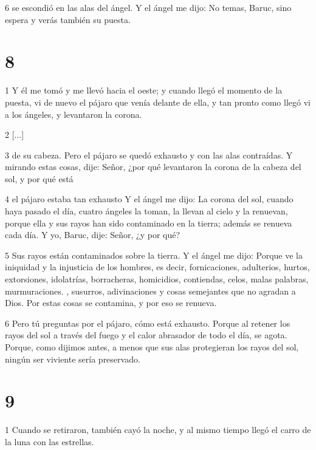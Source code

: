 \par 6 se escondió en las alas del ángel. Y el ángel me dijo: No temas, Baruc, sino espera y verás también su puesta.

\chapter{8}

\par 1 Y él me tomó y me llevó hacia el oeste; y cuando llegó el momento de la puesta, vi de nuevo el pájaro que venía delante de ella, y tan pronto como llegó vi a los ángeles, y levantaron la corona.

\par 2 [...]

\par 3 de su cabeza. Pero el pájaro se quedó exhausto y con las alas contraídas. Y mirando estas cosas, dije: Señor, ¿por qué levantaron la corona de la cabeza del sol, y por qué está

\par 4 el pájaro estaba tan exhausto Y el ángel me dijo: La corona del sol, cuando haya pasado el día, cuatro ángeles la toman, la llevan al cielo y la renuevan, porque ella y sus rayos han sido contaminado en la tierra; además se renueva cada día. Y yo, Baruc, dije: Señor, ¿y por qué?

\par 5 Sus rayos están contaminados sobre la tierra. Y el ángel me dijo: Porque ve la iniquidad y la injusticia de los hombres, es decir, fornicaciones, adulterios, hurtos, extorsiones, idolatrías, borracheras, homicidios, contiendas, celos, malas palabras, murmuraciones. , susurros, adivinaciones y cosas semejantes que no agradan a Dios. Por estas cosas se contamina, y por eso se renueva.

\par 6 Pero tú preguntas por el pájaro, cómo está exhausto. Porque al retener los rayos del sol a través del fuego y el calor abrasador de todo el día, se agota. Porque, como dijimos antes, a menos que sus alas protegieran los rayos del sol, ningún ser viviente sería preservado.

\chapter{9}

\par 1 Cuando se retiraron, también cayó la noche, y al mismo tiempo llegó el carro de la luna con las estrellas.

